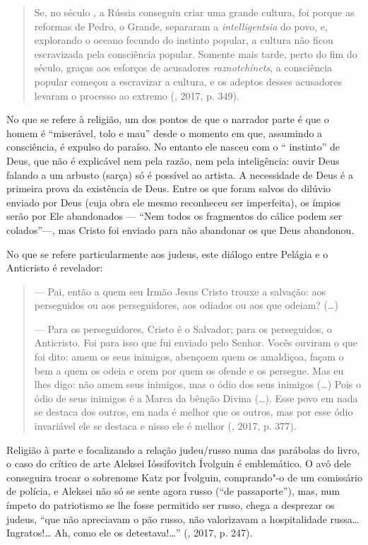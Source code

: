 \begin{quotation}
Se, no século , a Rússia conseguiu criar uma grande
cultura, foi porque as reformas de Pedro, o Grande, separaram a
\emph{intelligentsia} do povo, e, explorando o oceano fecundo do instinto
popular, a cultura não ficou escravizada pela consciência popular. Somente
mais tarde, perto do fim do século, graças aos esforços de
acusadores \emph{raznotchínets}, a consciência popular começou a escravizar a
cultura, e os adeptos desses acusadores levaram o processo ao extremo
(, 2017, p. 349).
\end{quotation}

No que se refere à religião, um dos pontos de que o narrador parte é que
o homem é ``miserável, tolo e mau'' desde o momento em que, assumindo a
consciência, é expulso do paraíso. No entanto ele nasceu com o ``
instinto'' de Deus, que não é explicável nem pela razão, nem pela
inteligência: ouvir Deus falando a um arbusto (sarça) só é possível ao artista.
A necessidade de Deus é a primeira prova da existência de Deus. Entre os
que foram salvos do dilúvio enviado por Deus (cuja obra ele mesmo
reconheceu ser imperfeita), os ímpios serão por Ele abandonados ---
``Nem todos os fragmentos do cálice podem ser colados''---, mas Cristo
foi enviado para não abandonar os que Deus abandonou.

No que se refere particularmente aos judeus, este diálogo entre Pelágia
e o Anticristo é revelador:

\begin{quotation}
--- Pai, então a quem seu Irmão Jesus Cristo trouxe a salvação: aos perseguidos ou aos perseguidores, aos odiados ou aos que odeiam? (\ldots{})

--- Para os perseguidores, Cristo é o Salvador; para os perseguidos, o
Anticristo. Foi para isso que fui enviado pelo Senhor. Vocês
ouviram o que foi dito: amem os seus inimigos, abençoem quem os
amaldiçoa, façam o bem a quem os odeia e orem por quem os ofende
e os persegue. Mas eu lhes digo: não amem seus inimigos, mas o ódio dos
seus inimigos (\ldots{}) Pois o ódio de seus inimigos é a Marca da bênção Divina
(\ldots{}). Esse povo em nada se destaca dos outros, em nada é
melhor que os outros, mas por esse ódio invariável ele se destaca e nisso ele é melhor
(, 2017, p. 377).
\end{quotation}

Religião à parte e focalizando a relação judeu/russo numa das
parábolas do livro, o caso do crítico de arte Aleksei Ióssifovitch
Ívolguin é emblemático. O avô dele conseguira trocar o sobrenome Katz por
Ívolguin, comprando"-o de um comissário de polícia, e Aleksei não só se sente agora
russo (``de passaporte''), mas, num ímpeto do patriotismo se lhe
fosse permitido ser russo, chega a desprezar os judeus,
``que não apreciavam o pão russo, não valorizavam a hospitalidade russa\ldots{} Ingratos!\ldots{}
Ah, como ele os detestava!\ldots{}'' (, 2017, p. 247).


